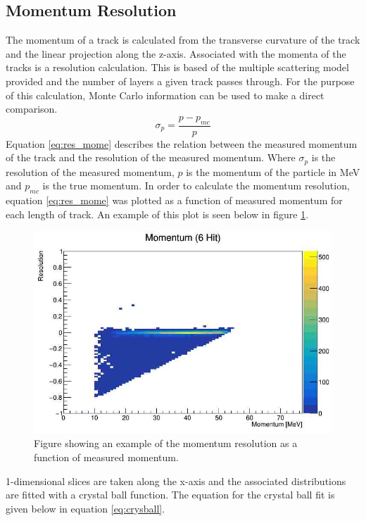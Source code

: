 \subsection{Momentum Resolution}
The momentum of a track is calculated from the transverse curvature of the track and the linear projection along the z-axis.
Associated with the momenta of the tracks is a resolution calculation. This is based of the multiple scattering model provided and the number of layers a given track passes through.
For the purpose of this calculation, Monte Carlo information can be used to make a direct comparison.
\begin{equation}
    \sigma _{p} = \frac{p - p_{mc}}{p}
    \label{eq:res_mome}
\end{equation}
Equation \ref{eq:res_mome} describes the relation between the measured momentum of the track and the resolution of the measured momentum.
Where $\sigma _{p}$ is the resolution of the measured momentum, $p$ is the momentum of the particle in MeV and $p_{mc}$ is the true momentum.
In order to calculate the momentum resolution, equation \ref{eq:res_mome} was plotted as a function of measured momentum for each length of track.
An example of this plot is seen below in figure \ref{fig:resex}.
\begin{figure}
    \centering
    \includegraphics[scale=0.5]{fig/tracking/2dres.jpeg}
    \caption{Figure showing an example of the momentum resolution as a function of measured momentum.}
    \label{fig:resex}
\end{figure}
\par
1-dimensional slices are taken along the x-axis and the associated distributions are fitted with a crystal ball function.
The equation for the crystal ball fit is given below in equation \ref{eq:crysball}.
